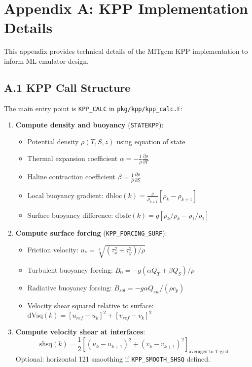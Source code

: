 \documentclass[11pt, a4paper]{article}
\begin{document}
\section*{Appendix A: KPP Implementation Details}

This appendix provides technical details of the MITgcm KPP implementation to inform ML emulator design.

\subsection*{A.1 KPP Call Structure}

The main entry point is \texttt{KPP\_CALC} in \texttt{pkg/kpp/kpp\_calc.F}:

\begin{enumerate}
    \item \textbf{Compute density and buoyancy} (\texttt{STATEKPP}):
    \begin{itemize}
        \item Potential density $\rho(T,S,z)$ using equation of state
        \item Thermal expansion coefficient $\alpha = -\frac{1}{\rho}\frac{\partial \rho}{\partial T}$
        \item Haline contraction coefficient $\beta = \frac{1}{\rho}\frac{\partial \rho}{\partial S}$
        \item Local buoyancy gradient: $\text{dbloc}(k) = \frac{g}{\rho_{k+1}}[\rho_k - \rho_{k+1}]$
        \item Surface buoyancy difference: $\text{dbsfc}(k) = g[\rho_k/\rho_k - \rho_1/\rho_1]$
    \end{itemize}

    \item \textbf{Compute surface forcing} (\texttt{KPP\_FORCING\_SURF}):
    \begin{itemize}
        \item Friction velocity: $u_* = \sqrt[4]{(\tau_x^2 + \tau_y^2)/\rho}$
        \item Turbulent buoyancy forcing: $B_0 = -g(\alpha Q_T + \beta Q_S)/\rho$
        \item Radiative buoyancy forcing: $B_{sol} = -g \alpha Q_{sw}/(\rho c_p)$
        \item Velocity shear squared relative to surface: $\text{dVsq}(k) = [u_{ref}-u_k]^2 + [v_{ref}-v_k]^2$
    \end{itemize}

    \item \textbf{Compute velocity shear at interfaces}:
    \begin{equation}
    \text{shsq}(k) = \frac{1}{2}\left[(u_k-u_{k+1})^2 + (v_k-v_{k+1})^2\right]_{\text{averaged to T-grid}}
    \end{equation}
    Optional: horizontal 121 smoothing if \texttt{KPP\_SMOOTH\_SHSQ} defined.


\end{enumerate}
\end{document}
